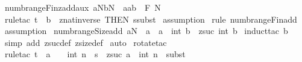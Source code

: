 \begin{isabellebody}
\isamarkupfalse%
%
\endisatagproof
{\isafoldproof}%
%
\isadelimproof
\isanewline
%
\endisadelimproof
\isanewline
\isanewline
{}\isamarkupfalse%
\ numb{\isacharunderscore}range{\isacharunderscore}Fin{\isacharunderscore}zadd{\isacharunderscore}aux{\isacharcolon}\ {\isachardoublequoteopen}{\isacharbrackleft}{\isacharbar}a{\isacharcolon}{\isacharpercent}N{\isacharsemicolon}b{\isacharcolon}{\isacharpercent}N{\isacharbar}{\isacharbrackright}\ {\isacharequal}{\isacharequal}{\isachargreater}\ {\isacharparenleft}a{\isachardot}{\isachardot}a{\isacharplus}b{\isacharparenright}\ {\isacharcolon}\ {\isacharpercent}F\ {\isacharpercent}N{\isachardoublequoteclose}\isanewline
%
\isadelimproof
%
\endisadelimproof
%
\isatagproof
{}\isamarkupfalse%
\ {\isacharparenleft}rule{\isacharunderscore}tac\ t\ {\isacharequal}\ {\isachardoublequoteopen}b{\isachardoublequoteclose}\ \ znat{\isacharunderscore}inverse\ {\isacharbrackleft}THEN\ ssubst{\isacharbrackright}{\isacharparenright}\isanewline
{}\isamarkupfalse%
\ assumption\isanewline
{}\isamarkupfalse%
\ {\isacharparenleft}rule\ numb{\isacharunderscore}range{\isacharunderscore}Fin{\isacharunderscore}add{\isacharparenright}\isanewline
{}\isamarkupfalse%
\ assumption\isanewline
{}\isamarkupfalse%
%
\endisatagproof
{\isafoldproof}%
%
\isadelimproof
\isanewline
%
\endisadelimproof
\isanewline
\isanewline
{}\isamarkupfalse%
\ numb{\isacharunderscore}range{\isacharunderscore}Size{\isacharunderscore}add{\isacharcolon}\ {\isachardoublequoteopen}a{\isacharcolon}{\isacharpercent}N\ {\isacharequal}{\isacharequal}{\isachargreater}\ {\isacharhash}{\isacharparenleft}a\ {\isachardot}{\isachardot}\ {\isacharparenleft}a\ {\isacharplus}\ int\ b{\isacharparenright}{\isacharparenright}\ {\isacharequal}\ zsuc\ {\isacharparenleft}int\ b{\isacharparenright}{\isachardoublequoteclose}\isanewline
%
\isadelimproof
%
\endisadelimproof
%
\isatagproof
{}\isamarkupfalse%
\ {\isacharparenleft}induct{\isacharunderscore}tac\ {\isachardoublequoteopen}b{\isachardoublequoteclose}{\isacharparenright}\isanewline
{}\isamarkupfalse%
\ {\isacharparenleft}simp\ add{\isacharcolon}\ zsuc{\isacharunderscore}def\ zsize{\isacharunderscore}def{\isacharparenright}\isanewline
{}\isamarkupfalse%
\ auto\isanewline
{}\isamarkupfalse%
\ {\isacharparenleft}rotate{\isacharunderscore}tac\ {}{\isacharparenright}\isanewline
{}\isamarkupfalse%
\ {\isacharparenleft}rule{\isacharunderscore}tac\ t\ {\isacharequal}\ {\isachardoublequoteopen}a\ {\isacharplus}\ {\isacharparenleft}{}\ {\isacharplus}\ int\ n{\isacharparenright}{\isachardoublequoteclose}\ \ s\ {\isacharequal}\ {\isachardoublequoteopen}zsuc\ {\isacharparenleft}a\ {\isacharplus}\ int\ n{\isacharparenright}{\isachardoublequoteclose}\ \ subst{\isacharparenright}\isanewline

\end{isabellebody}
